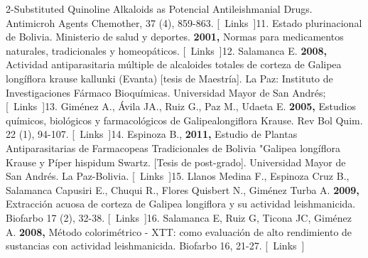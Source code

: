 \documentclass{article}
\begin{document}
{2-Substituted Quinoline Alkaloids as Potencial Antileishmanial Drugs. Antimicroh Agents Chemother, 37 (4), 859-863.    [ Links ]}{11. Estado plurinacional de Bolivia. Ministerio de salud y deportes. \renewcommand{\children}{2001, }\textbf{\children}
Normas para medicamentos naturales, tradicionales y homeopáticos.    [ Links ]}{12. Salamanca E. \renewcommand{\children}{2008, }\textbf{\children}
Actividad antiparasitaria múltiple de alcaloides totales de corteza de Galipea longíflora krause kallunki (Evanta) [tesis de Maestría]. La Paz: Instituto de Investigaciones Fármaco Bioquímicas. Universidad Mayor de San Andrés;    [ Links ]}{13. Giménez A., Ávila JA., Ruiz G., Paz M., Udaeta E. \renewcommand{\children}{2005, }\textbf{\children}
Estudios químicos, biológicos y farmacológicos de Galipealongiflora Krause. Rev Bol Quim. 22 (1), 94-107.    [ Links ]}{14. Espinoza B., \renewcommand{\children}{2011, }\textbf{\children}
Estudio de Plantas Antiparasitarias de Farmacopeas Tradicionales de Bolivia "Galipea longíflora Krause y Píper hispidum Swartz. [Tesis de post-grado]. Universidad Mayor de San Andrés. La Paz-Bolivia.    [ Links ]}{15. Llanos Medina F., Espinoza Cruz B., Salamanca Capusiri E., Chuqui R., Flores Quisbert N., Giménez Turba A. \renewcommand{\children}{2009, }\textbf{\children}
Extracción acuosa de corteza de Galipea longiflora y su actividad leishmanicida. Biofarbo 17 (2), 32-38.    [ Links ]}{16. Salamanca E, Ruiz G, Ticona JC, Giménez A. \renewcommand{\children}{2008, }\textbf{\children}
Método colorimétrico - XTT: como evaluación de alto rendimiento de sustancias con actividad leishmanicida. Biofarbo 16, 21-27.    [ Links ]}
\end{document}

